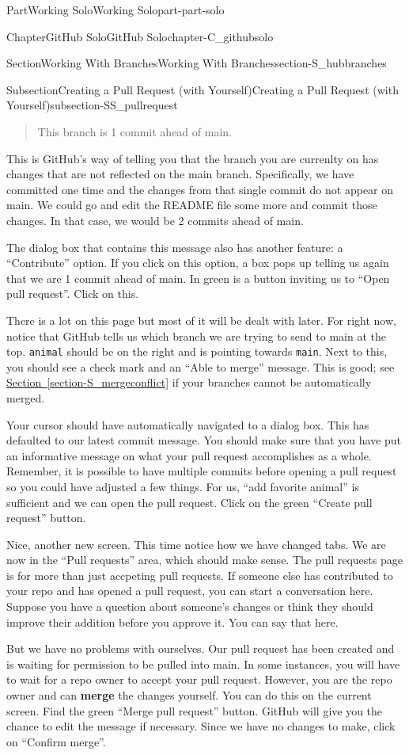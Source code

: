 \documentclass[oneside,10pt,]{book}
\newcommand{\xreffont}{\relax}
\newcommand{\mono}[1]{\texttt{#1}}
\newcommand{\terminology}[1]{\textbf{#1}}
\begin{document}
\begin{partptx}{Part}{Working Solo}{}{Working Solo}{}{}{part-part-solo}
\begin{chapterptx}{Chapter}{GitHub Solo}{}{GitHub Solo}{}{}{chapter-C_githubsolo}
\begin{sectionptx}{Section}{Working With Branches}{}{Working With Branches}{}{}{section-S_hubbranches}
\begin{subsectionptx}{Subsection}{Creating a Pull Request (with Yourself)}{}{Creating a Pull Request (with Yourself)}{}{}{subsection-SS_pullrequest}
\begin{quote}%
This branch is 1 commit ahead of main.%
\end{quote}
This is GitHub's way of telling you that the branch you are currenlty on has changes that are not reflected on the main branch. Specifically, we have committed one time and the changes from that single commit do not appear on main. We could go and edit the README file some more and commit those changes. In that case, we would be 2 commits ahead of main.%
\par
The dialog box that contains this message also has another feature: a ``Contribute'' option. If you click on this option, a box pops up telling us again that we are 1 commit ahead of main. In green is a button inviting us to ``Open pull request''. Click on this.%
\par
There is a lot on this page but most of it will be dealt with later. For right now, notice that GitHub tells us which branch we are trying to send to main at the top. \mono{animal} should be on the right and is pointing towards \mono{main}. Next to this, you should see a check mark and an ``Able to merge'' message. This is good; see \hyperref[section-S_mergeconflict]{Section~{\xreffont\ref{section-S_mergeconflict}}} if your branches cannot be automatically merged.%
\par
Your cursor should have automatically navigated to a dialog box. This has defaulted to our latest commit message. You should make sure that you have put an informative message on what your pull request accomplishes as a whole. Remember, it is possible to have multiple commits before opening a pull request so you could have adjusted a few things. For us, ``add favorite animal'' is sufficient and we can open the pull request. Click on the green ``Create pull request'' button.%
\par
Nice, another new screen. This time notice how we have changed tabs. We are now in the ``Pull requests'' area, which should make sense. The pull requests page is for more than just accpeting pull requests. If someone else has contributed to your repo and has opened a pull request, you can start a conversation here. Suppose you have a question about someone's changes or think they should improve their addition before you approve it. You can say that here.%
\par
But we have no problems with ourselves. Our pull request has been created and is waiting for permission to be pulled into main. In some instances, you will have to wait for a repo owner to accept your pull request. However, you are the repo owner and can \terminology{merge} the changes yourself. You can do this on the current screen. Find the green ``Merge pull request'' button. GitHub will give you the chance to edit the message if necessary. Since we have no changes to make, click on ``Confirm merge''.%

\end{subsectionptx}
\end{sectionptx}
\end{chapterptx}
\end{partptx}
\end{document}
